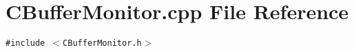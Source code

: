 \section{CBuffer\-Monitor.cpp File Reference}
\label{CBufferMonitor_8cpp}
{\tt \#include $<$CBuffer\-Monitor.h$>$}\par
